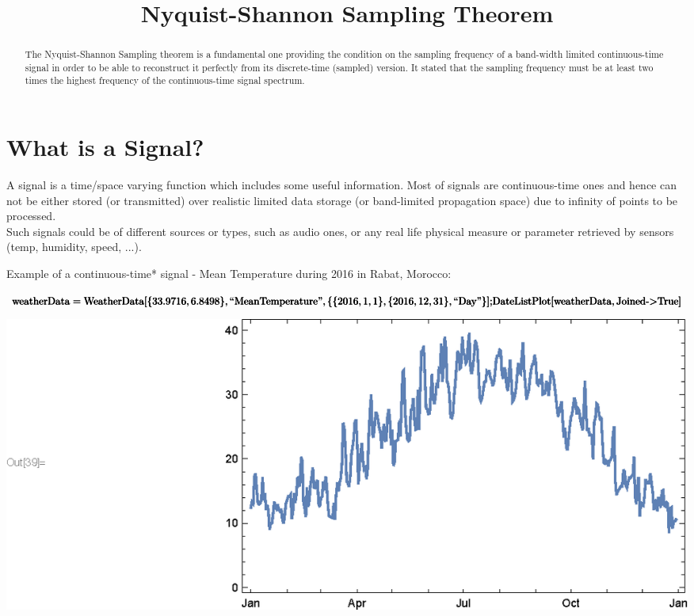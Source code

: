 \documentclass{report}
\begin{document}
\title{Nyquist-Shannon Sampling Theorem}
\author{}
\date{}
\maketitle

\begin{abstract}The Nyquist-Shannon Sampling theorem is a fundamental one providing the condition on the sampling frequency of a band-width limited
continuous-time signal in order to be able to reconstruct it perfectly from its discrete-time (sampled) version. It stated that the sampling frequency
must be at least two times the highest frequency of the continuous-time signal spectrum.\end{abstract}

\section*{What is a Signal?}

A signal is a time/space varying function which includes some useful information. Most of signals are continuous-time ones and hence can not be either
stored (or transmitted) over realistic limited data storage (or band-limited propagation space) due to infinity of points to be processed.\\
Such signals could be of different sources or types, such as audio ones, or any real life physical measure or parameter retrieved by sensors (temp,
humidity, speed, ...).

Example of a continuous-time* signal - Mean Temperature during 2016 in Rabat, Morocco:

\begin{doublespace}
\noindent\(\pmb{\text{weatherData}=\text{WeatherData}[\{33.9716,6.8498\}, \text{{``}MeanTemperature{''}}, \{\{2016, 1, 1\}, \{2016, 12, 31\}, \text{{``}Day{''}}\}];}\\
\pmb{\text{DateListPlot}[\text{weatherData},\text{Joined} \text{-$>$} \text{True}]}\)
\end{doublespace}

\includegraphics{TopicExploration_GhassaneAniba_gr1.eps}
\end{document}
